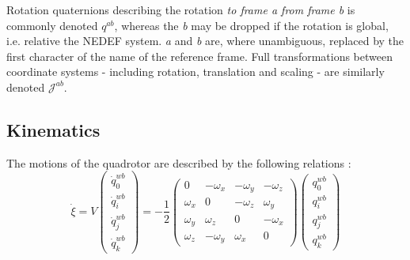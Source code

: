         Rotation quaternions describing the rotation \textit{to frame a from frame b}
        is commonly denoted $q^{ab}$, whereas the \textit{b} may be dropped if the rotation is global, i.e. relative the NEDEF system.
        \textit{a} and \textit{b} are, where unambiguous, replaced by the first character of the
        name of the reference frame.
        Full transformations between coordinate systems - including rotation, translation and scaling -
        are similarly denoted $\mathcal{J}^{ab}$.

    \subsection{Kinematics}
        The motions of the quadrotor are described by the following relations \citep{Pounds_modellingand}: %
        \begin{subequations}
            \label{eq:observer:kinematicsc}
            \begin{equation}
                \label{eq:observer:position}
                \dot{\xi} = V
            \end{equation}
            \begin{equation}
                \label{eq:observer:quaternionsc}
                \left(\begin{array}{c}
                    \dot{q}^{wb}_{0} \\
                    \dot{q}^{wb}_{i} \\
                    \dot{q}^{wb}_{j} \\
                    \dot{q}^{wb}_{k}
                \end{array}\right) = -\frac{1}{2}\left(\begin{array}{cccc}
                0 & -\omega_{x} & -\omega_{y} & -\omega_{z} \\
                \omega_{x} & 0 & -\omega_{z} & \omega_{y} \\
                \omega_{y} & \omega_{z} & 0 & -\omega_{x} \\
                \omega_{z} & -\omega_{y} & \omega_{x} & 0
                \end{array}\right)\left(\begin{array}{c}
                q^{wb}_{0} \\
                q^{wb}_{i} \\
                q^{wb}_{j} \\
                q^{wb}_{k}
                \end{array}\right)
            \end{equation}
        \end{subequations}

